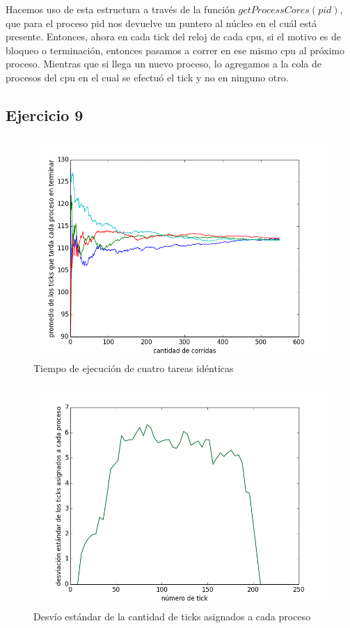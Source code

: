 \documentclass[11pt, a4paper, twoside]{article}
\begin{document}
Hacemos uso de esta estructura a través de la función $getProcessCores(pid)$, que para 
el proceso pid nos devuelve un puntero al núcleo en el cuál está presente. Entonces, ahora
en cada tick del reloj de cada cpu, si el motivo es de bloqueo o terminación, entonces pasamos a correr en ese mismo
cpu al próximo proceso. Mientras que si llega un nuevo proceso, lo agregamos a la cola de procesos del cpu
en el cual se efectuó el tick y no en ninguno otro. 

\clearpage
\subsection{Ejercicio 9}

\begin{figure}[H]
\centering
\includegraphics[scale=0.66]{../experimentacion/ej9-fairness/tiempo_final/prueba-tiempo-final.png}
\caption{Tiempo de ejecución de cuatro tareas idénticas}
\end{figure}

\begin{figure}[H]
\centering
\includegraphics[scale=0.66]{../experimentacion/ej9-fairness/fairness/plot.png}
\caption{Desvío estándar de la cantidad de ticks asignados a cada proceso}
\end{figure}
\end{document}

